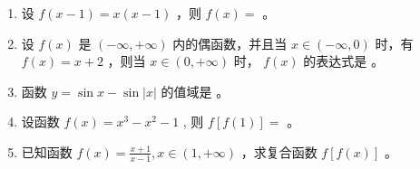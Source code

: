 \documentclass[12pt, a4paper]{article}
\newcommand{\blank}[1]{\underline{\hspace{#1}}}
\begin{document}
\begin{enumerate}
    \item 设 $ f(x-1)=x(x-1) $ ，则 $ f(x)= $ \blank{2cm}。

    \item 设 $ f(x) $ 是 $ (-\infty, +\infty) $ 内的偶函数，并且当 $ x \in (-\infty, 0) $ 时，有 $ f(x) = x + 2 $ ，则当 $ x \in (0, +\infty) $ 时， $ f(x) $ 的表达式是 \blank{2cm}。

    \item 函数 $ y = \sin x - \sin |x| $ 的值域是 \blank{2cm}。

    \item 设函数 $ f(x)=x^{3}-x^{2}-1 $ , 则 $ f[f(1)]= $ \blank{2cm}。

    \item 已知函数 $ f(x)=\frac{x+1}{x-1},x\in(1,+\infty) $ ，求复合函数 $ f[f(x)] $ 。
\end{enumerate}
\end{document}

